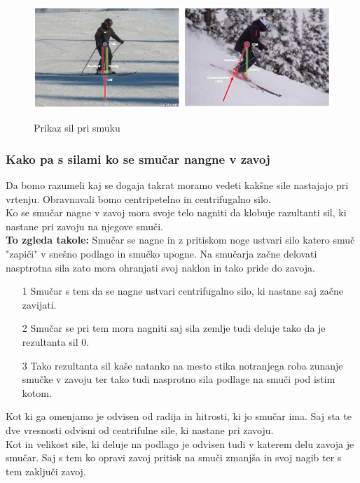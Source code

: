 \documentclass{article}
\begin{document}
\begin{figure}
    \centering
    \includegraphics[scale=0.8]{../images/Screenshot 2023-12-03 152058.png} \\
    \caption[short]{Prikaz sil pri smuku}
\end{figure}


\subsubsection*{Kako pa s silami ko se smučar nangne v zavoj}
Da bomo razumeli kaj se dogaja takrat moramo vedeti kakšne sile nastajajo pri vrtenju. Obravnavali bomo centripetelno in centrifugalno silo. \\ \newline
Ko se smučar nagne v zavoj mora svoje telo nagniti da klobuje razultanti sil, ki nastane pri zavoju na njegove smuči. \\ \newline
\textbf{To zgleda takole:} \newline 
Smučar se nagne in z pritiskom noge ustvari silo katero smuč "zapiči" v snešno podlago in smučko upogne. Na smučarja začne delovati nasptrotna sila zato mora ohranjati svoj naklon in tako pride do zavoja.
\begin{itemize}
    \item[1] Smučar s tem da se nagne ustvari centrifugalno silo, ki nastane saj začne zavijati.
    \item[2] Smučar se pri tem mora nagniti saj sila zemlje tudi deluje tako da je rezultanta sil 0. 
    \item[3] Tako rezultanta sil kaše natanko na mesto stika notranjega roba zunanje smučke v zavoju ter tako tudi nasprotno sila podlage na smuči pod istim kotom.
\end{itemize} 
Kot ki ga omenjamo je odvisen od radija in hitrosti, ki jo smučar ima. Saj sta te dve vresnosti odvisni od centrifulne sile, ki nastane pri zavoju. \\ \newline
Kot in velikost sile, ki deluje na podlago je odvisen tudi v katerem delu zavoja je smučar. Saj s tem ko opravi zavoj pritisk na smuči zmanjša in svoj nagib ter s tem zaključi zavoj.
\end{document}
